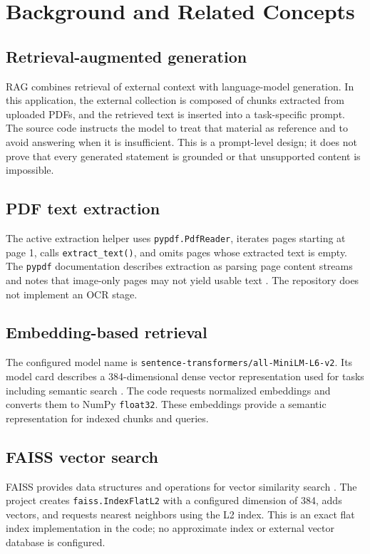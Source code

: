 \chapter{Background and Related Concepts}
\label{ch:background}

\section{Retrieval-augmented generation}
RAG combines retrieval of external context with language-model generation. In this application, the external collection is composed of chunks extracted from uploaded PDFs, and the retrieved text is inserted into a task-specific prompt. The source code instructs the model to treat that material as reference and to avoid answering when it is insufficient. This is a prompt-level design; it does not prove that every generated statement is grounded or that unsupported content is impossible.

\section{PDF text extraction}
The active extraction helper uses \texttt{pypdf.PdfReader}, iterates pages starting at page 1, calls \texttt{extract\_text()}, and omits pages whose extracted text is empty. The \texttt{pypdf} documentation describes extraction as parsing page content streams and notes that image-only pages may not yield usable text \citep{pypdfdocs}. The repository does not implement an OCR stage.

\section{Embedding-based retrieval}
The configured model name is \texttt{sentence-transformers/all-MiniLM-L6-v2}. Its model card describes a 384-dimensional dense vector representation used for tasks including semantic search \citep{minilmcard}. The code requests normalized embeddings and converts them to NumPy \texttt{float32}. These embeddings provide a semantic representation for indexed chunks and queries.

\section{FAISS vector search}
FAISS provides data structures and operations for vector similarity search \citep{faissdocs}. The project creates \texttt{faiss.IndexFlatL2} with a configured dimension of 384, adds vectors, and requests nearest neighbors using the L2 index. This is an exact flat index implementation in the code; no approximate index or external vector database is configured.


